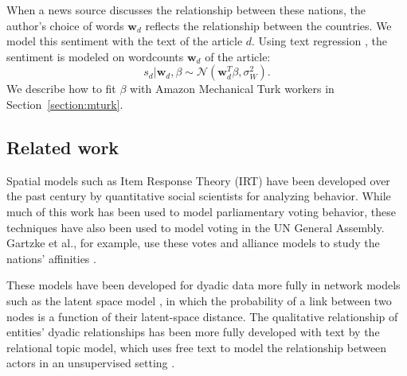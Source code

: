 \label{section:text_regression}
When a news source discusses the relationship between these nations,
the author's choice of words $\bm w_d$ reflects the relationship
between the countries.  We model this sentiment with the text of the
article $d$.  Using text regression \cite{kogan:2009}, the sentiment is modeled on wordcounts $\bm w_d$ of the article:
\[
  s_d | \bm w_d, \beta \sim \mathcal{N}( \bm w_d^T \beta , \sigma_W^2 ).
\]
We describe how to fit $\beta$ with Amazon Mechanical Turk workers in
Section~\ref{section:mturk}.



\subsection{Related work}

Spatial models such as Item Response Theory (IRT) have been developed
over the past century by quantitative social scientists for analyzing
behavior.  While much of this work has been used to model
parliamentary voting behavior, these techniques have also been used to
model voting in the UN General Assembly. Gartzke et al., for example,
use these votes and alliance models to study the nations' affinities
\cite{gartzke:1998}.

These models have been developed for dyadic data more fully in network
models such as the latent space model \cite{hoff:2002,sarkar:2005}, in
which the probability of a link between two nodes is a function of
their latent-space distance.  The qualitative relationship of
entities' dyadic relationships has been more fully developed with text
by the relational topic model, which uses free text to model the
relationship between actors in an unsupervised setting
\cite{chang:2009}.


